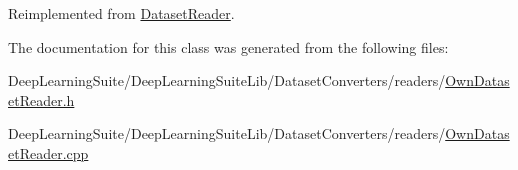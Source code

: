 Reimplemented from \hyperlink{class_dataset_reader_a732438244cec7c20294f93c6b635888c}{Dataset\+Reader}.



The documentation for this class was generated from the following files\+:\begin{DoxyCompactItemize}
\item 
Deep\+Learning\+Suite/\+Deep\+Learning\+Suite\+Lib/\+Dataset\+Converters/readers/\hyperlink{_own_dataset_reader_8h}{Own\+Dataset\+Reader.\+h}\item 
Deep\+Learning\+Suite/\+Deep\+Learning\+Suite\+Lib/\+Dataset\+Converters/readers/\hyperlink{_own_dataset_reader_8cpp}{Own\+Dataset\+Reader.\+cpp}\end{DoxyCompactItemize}
